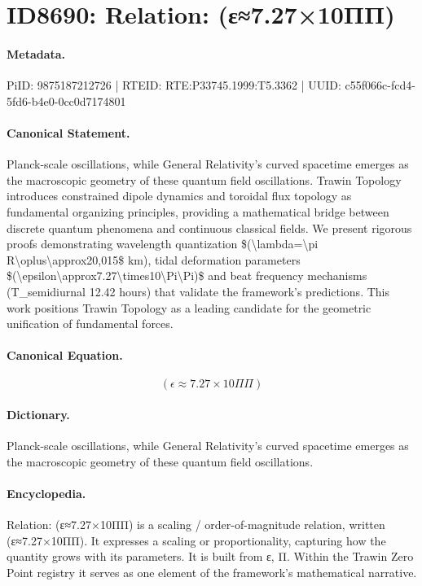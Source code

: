 \section*{ID8690: Relation: (ε≈7.27×10ΠΠ)}
\paragraph{Metadata.}
PiID: 9875187212726 | RTEID: RTE:P33745.1999:T5.3362 | UUID: c55f066c-fcd4-5fd6-b4e0-0cc0d7174801

\paragraph{Canonical Statement.}
Planck-scale oscillations, while General Relativity's curved spacetime emerges as the macroscopic geometry of these quantum field oscillations. Trawin Topology introduces constrained dipole dynamics and toroidal flux topology as fundamental organizing principles, providing a mathematical bridge between discrete quantum phenomena and continuous classical fields. We present rigorous proofs demonstrating wavelength quantization \$(\textbackslash{}lambda=\textbackslash{}pi R\textbackslash{}oplus\textbackslash{}approx20,015\$ km), tidal deformation parameters \$(\textbackslash{}epsilon\textbackslash{}approx7.27\textbackslash{}times10\textbackslash{}Pi\textbackslash{}Pi)\$ and beat frequency mechanisms (T\_semidiurnal 12.42 hours) that validate the framework's predictions. This work positions Trawin Topology as a leading candidate for the geometric unification of fundamental forces.

\paragraph{Canonical Equation.}
\[
(\epsilon\approx7.27\times10\Pi\Pi)
\]

\paragraph{Dictionary.}
Planck-scale oscillations, while General Relativity's curved spacetime emerges as the macroscopic geometry of these quantum field oscillations.

\paragraph{Encyclopedia.}
Relation: (ε≈7.27×10ΠΠ) is a scaling / order-of-magnitude relation, written (ε≈7.27×10ΠΠ). It expresses a scaling or proportionality, capturing how the quantity grows with its parameters. It is built from ε, Π. Within the Trawin Zero Point registry it serves as one element of the framework's mathematical narrative.
